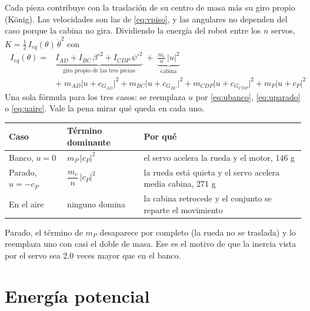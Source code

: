 \documentclass[11pt,a4paper]{article}
\begin{document}
Cada pieza contribuye con la traslación de su centro de masa más su giro propio (König). Las velocidades son
las de \eqref{eq:vpiso}, y las angulares no dependen del caso porque la cabina no gira. Dividiendo la energía
del robot entre los \(n\) servos, \(K=\tfrac12\,I_{eq}(\theta)\,\dot\theta^2\) con
\begin{equation}
\boxed{\;
\begin{aligned}
I_{eq}(\theta)={}&\underbrace{I_{AD}+I_{BC}\,\beta'^2+I_{CDP}\,\psi'^2}_{\text{giro propio de las tres piezas}}
\;+\;\underbrace{\frac{m_c}{n}\,\bigl|u\bigr|^2}_{\text{cabina}}\\[2pt]
&+\;m_{AD}\bigl|u+c_{G_{AD}}\bigr|^2+m_{BC}\bigl|u+c_{G_{BC}}\bigr|^2
+m_{CDP}\bigl|u+c_{G_{CDP}}\bigr|^2+m_P\bigl|u+c_P\bigr|^2
\end{aligned}
\;}
\label{eq:Ieq}
\end{equation}
Una sola fórmula para los tres casos: se reemplaza \(u\) por \eqref{eq:ubanco}, \eqref{eq:uparado} o
\eqref{eq:uaire}. Vale la pena mirar qué queda en cada uno.

\begin{center}\small
\begin{tabular}{lll}
\toprule
Caso & Término dominante & Por qué \\
\midrule
Banco, \(u=0\) & \(m_P\,|c_P|^2\) & el servo acelera la rueda y el motor, 146 g \\
Parado, \(u=-c_P\) & \(\dfrac{m_c}{n}\,|c_P|^2\) & la rueda está quieta y el servo acelera media cabina, 271 g \\
En el aire & ninguno domina & la cabina retrocede y el conjunto se reparte el movimiento \\
\bottomrule
\end{tabular}
\end{center}

Parado, el término de \(m_P\) desaparece por completo (la rueda no se traslada) y lo reemplaza uno con casi
el doble de masa. Ese es el motivo de que la inercia vista por el servo sea 2.0 veces mayor que en el banco.

\section{Energía potencial}
\end{document}
